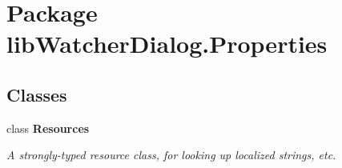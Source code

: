 \hypertarget{namespacelib_watcher_dialog_1_1_properties}{\section{Package lib\+Watcher\+Dialog.\+Properties}
\label{namespacelib_watcher_dialog_1_1_properties}
}
\subsection*{Classes}
\begin{DoxyCompactItemize}
\item 
class {\bfseries Resources}
\begin{DoxyCompactList}\small\item\em A strongly-\/typed resource class, for looking up localized strings, etc. \end{DoxyCompactList}\end{DoxyCompactItemize}
